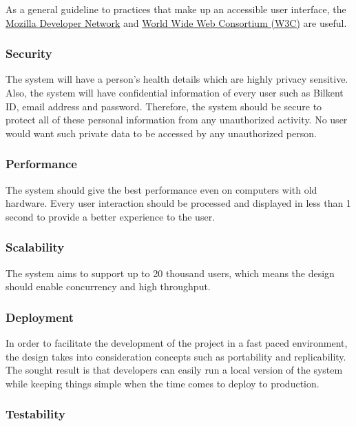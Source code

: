 \documentclass[a4paper, 12pt, titlepage]{article}
\begin{document}
  As a general guideline to practices that make up an accessible user interface,
  the \href{https://developer.mozilla.org/en-US/docs/Web/Accessibility}{Mozilla Developer Network} and
  \href{https://www.w3.org/standards/webdesign/accessibility}{World Wide Web Consortium (W3C)} are useful.

  \subsubsection{Security}

  The system will have a person's health details which are highly privacy sensitive.
  Also, the system will have confidential information of every user such as Bilkent ID,
  email address and password. Therefore, the system should be secure to protect
  all of these personal information from any unauthorized activity.
  No user would want such private data to be accessed by any unauthorized person.

  \subsubsection{Performance}

  The system should give the best performance even on computers with old hardware.
  Every user interaction should be processed and displayed in less than 1 second to provide
  a better experience to the user.

  \subsubsection{Scalability}

  The system aims to support up to 20 thousand users, which means the design should enable concurrency and high throughput.

  \subsubsection{Deployment}

  In order to facilitate the development of the project in a fast paced environment,
  the design takes into consideration concepts such as portability and replicability.
  The sought result is that developers can easily run a local version of the system while
  keeping things simple when the time comes to deploy to production.

  \subsubsection{Testability}
\end{document}
